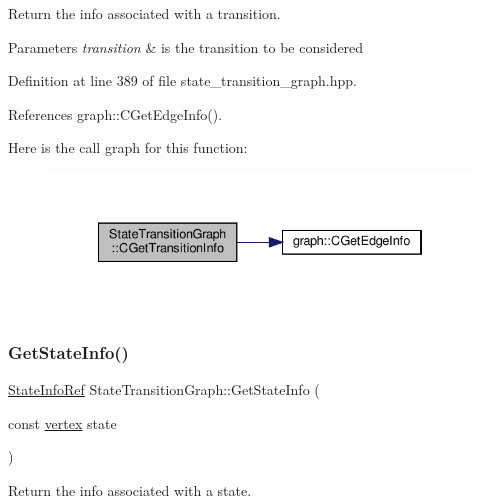 Return the info associated with a transition. 


\begin{DoxyParams}{Parameters}
{\em transition} & is the transition to be considered \\
\hline
\end{DoxyParams}


Definition at line 389 of file state\+\_\+transition\+\_\+graph.\+hpp.



References graph\+::\+C\+Get\+Edge\+Info().

Here is the call graph for this function\+:
\nopagebreak
\begin{figure}[H]
\begin{center}
\leavevmode
\includegraphics[width=334pt]{d9/d86/structStateTransitionGraph_a98cdb3dd6dbe46e3b19ef361d1c31e45_cgraph}
\end{center}
\end{figure}
\mbox{\label{structStateTransitionGraph_a3499813fbff2a9cb30b5142fb570652c}} 
\subsubsection{\texorpdfstring{Get\+State\+Info()}{GetStateInfo()}}
{\footnotesize\ttfamily \hyperlink{state__transition__graph_8hpp_aeb406353b516fb2c706df12defd64c99}{State\+Info\+Ref} State\+Transition\+Graph\+::\+Get\+State\+Info (\begin{DoxyParamCaption}\item[{const \hyperlink{graph_8hpp_abefdcf0544e601805af44eca032cca14}{vertex}}]{state }\end{DoxyParamCaption})\hspace{0.3cm}{\ttfamily [inline]}}



Return the info associated with a state. 


